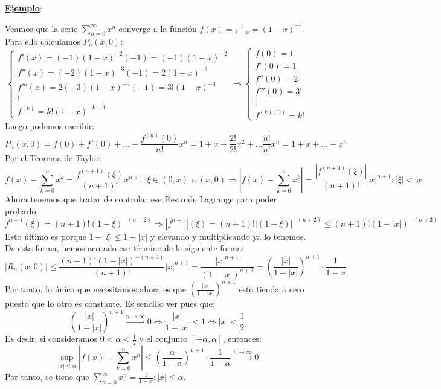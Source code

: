 \documentclass[10pt,a4paper,openright]{book}
\theoremstyle{break}
\begin{document}
\underline{\textbf{Ejemplo}}:

Veamos que la serie $\sum_{n = 0}^{\infty} x^n$ converge a la función $f(x) = \frac{1}{1-x} = (1-x)^{-1}$. Para ello calculamos $P_n(x,0)$:
$$\begin{cases} f'(x) = (-1) (1-x)^{-2} (-1) = (-1) (1-x)^{-2} \\
f''(x) = (-2) (1-x)^{-3} (-1) = 2 (1-x)^{-3} \\
f'''(x) = 2 (-3) (1-x)^{-4} (-1) = 3! (1-x)^{-4} \\
\vdots \\
f^{(k)} = k! (1-x)^{-k - 1}
\end{cases} \Rightarrow \begin{cases} f(0) = 1 \\ f'(0) = 1 \\ f''(0) = 2 \\ f'''(0) = 3! \\ \vdots \\ f^{(k)(0)} = k! \end{cases}$$
Luego podemos escribir:
$$P_n (x, 0) = f(0) + f'(0) + \ldots + \frac{f^{(n)} (0)}{n!} x^n = 1+  x + \frac{2!}{2!} x^2 + \ldots \frac{n!}{n!} x^n = 1+ x + \ldots + x^n$$
Por el Teorema de Taylor:
$$f(x) - \sum_{k=0}^{n} x^k = \frac{f^{(n+1)}(\xi)}{(n+1)!} x^{n+1} : \xi \in (0,x) \mbox{ o } (x, 0) \Rightarrow \left| f(x) - \sum_{k=0}^{n} x^k \right|= \frac{|f^{(n+1)} (\xi)|}{(n+1)!} |x|^{n+1} : |\xi| < |x|$$
Ahora tenemos que tratar de controlar ese Resto de Lagrange para poder probarlo:
$$f^{n+1} (\xi) = (n+1)! (1-\xi)^{- (n+2)} \Rightarrow |f^{n+1}| (\xi) = (n+1)! |(1-\xi)|^{- (n+2)} \leq (n+1)! (1 - |x|)^{- (n+2)} $$
Esto último es porque $1-|\xi| \leq 1 - |x|$ y elevando y multiplicando ya lo tenemos. De esta forma, hemos acotado ese término de la siguiente forma:
$$|R_n (x,0) | \leq \frac{(n+1) ! (1 - |x|)^{- (n+2)} }{(n+1)!} |x|^{n+1} = \frac{|x|^{n+1}}{(1 - |x|)^ {n+2}} = \left(\frac{|x|}{1-|x|}\right)^{n+1} \cdot \frac{1}{1-x}$$
Por tanto, lo único que necesitamos ahora es que $\left(\frac{|x|}{1-|x|}\right)^{n+1}$ esto tienda a cero puesto que lo otro es constante. Es sencillo ver pues que:
$$\left(\frac{|x|}{1-|x|}\right)^{n+1} \xrightarrow{n\rightarrow\infty} 0\Leftrightarrow \frac{|x|}{1-|x|} < 1 \Leftrightarrow |x| < \frac{1}{2}$$
Es decir, si consideramos  $0 < \alpha < \frac{1}{2}$ y el conjunto $[-\alpha, \alpha]$, entonces:
$$\underset{|x| \leq \alpha} {\sup} \left|f(x) - \sum_{k=0}^{n} x^n\right| \leq \left(\frac{\alpha}{1 - \alpha}\right)^{n+1} \cdot \frac{1}{1-\alpha} \xrightarrow{n\rightarrow\infty} 0$$
Por tanto, se tiene que $\sum_{n=0}^{\infty} x^n = \frac{1}{1-x} : |x| \leq \alpha$.
\end{document}
